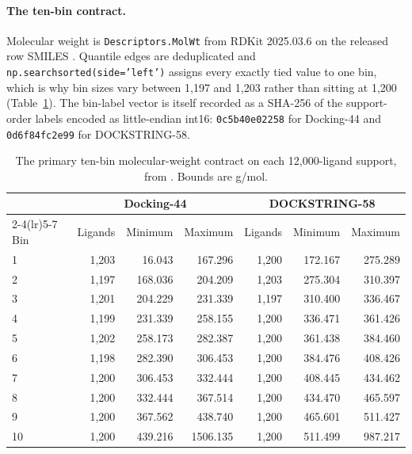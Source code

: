\paragraph{The ten-bin contract.} Molecular weight is \texttt{Descriptors.MolWt} from RDKit
2025.03.6 on the released row SMILES \cite{rdkit2025}. Quantile edges are deduplicated and
\texttt{np.searchsorted(side='left')} assigns every exactly tied value to one bin, which is why
bin sizes vary between 1{,}197 and 1{,}203 rather than sitting at 1{,}200
(Table~\ref{tab:s2bins}). The bin-label vector is itself recorded as a SHA-256 of the
support-order labels encoded as little-endian int16: \texttt{0c5b40e02258} for Docking-44 and
\texttt{0d6f84fc2e99} for DOCKSTRING-58.

\begin{table}[htbp]
\centering
\caption{The primary ten-bin molecular-weight contract on each 12{,}000-ligand support, from
\protect{}. Bounds are
g/mol.}
\label{tab:s2bins}
\small
\begin{tabular}{lrrrrrr}
\toprule
& \multicolumn{3}{c}{Docking-44} & \multicolumn{3}{c}{DOCKSTRING-58} \\
\cmidrule(lr){2-4}\cmidrule(lr){5-7}
Bin & Ligands & Minimum & Maximum & Ligands & Minimum & Maximum \\
\midrule
1 & 1{,}203 & 16.043 & 167.296 & 1{,}200 & 172.167 & 275.289 \\
2 & 1{,}197 & 168.036 & 204.209 & 1{,}203 & 275.304 & 310.397 \\
3 & 1{,}201 & 204.229 & 231.339 & 1{,}197 & 310.400 & 336.467 \\
4 & 1{,}199 & 231.339 & 258.155 & 1{,}200 & 336.471 & 361.426 \\
5 & 1{,}202 & 258.173 & 282.387 & 1{,}200 & 361.438 & 384.460 \\
6 & 1{,}198 & 282.390 & 306.453 & 1{,}200 & 384.476 & 408.426 \\
7 & 1{,}200 & 306.453 & 332.444 & 1{,}200 & 408.445 & 434.462 \\
8 & 1{,}200 & 332.444 & 367.514 & 1{,}200 & 434.470 & 465.597 \\
9 & 1{,}200 & 367.562 & 438.740 & 1{,}200 & 465.601 & 511.427 \\
10 & 1{,}200 & 439.216 & 1506.135 & 1{,}200 & 511.499 & 987.217 \\
\bottomrule
\end{tabular}
\end{table}

